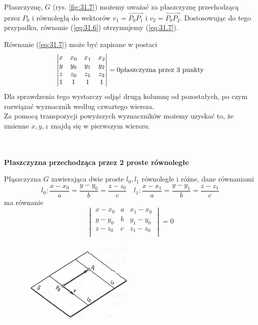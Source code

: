 \begin{dowod}
Płaszczyznę, $G$ (rys. \ref{fig:31.7}) możemy uważać za płaszczyznę przechodzącą przez $P_0$ i równoległą do wektorów $v_1 = \stackrel{\rightarrow}{P_0P_1}$ i $v_2 = \stackrel{\rightarrow}{P_0P_2}$. Dostosowując do tego przypadku, równanie (\ref{eq:31.6}) otrzymujemy (\ref{eq:31.7}).
\end{dowod}

\begin{uwaga}{1}
Równanie (\ref{eq:31.7}) może być zapisane w postaci
\begin{equation}
	\begin{vmatrix}
		x & x_0 & x_1 & x_2\\
		y & y_0 & y_1 & y_2\\
		z & z_0 & z_1 & z_2\\
		1 & 1 & 1 & 1
	\end{vmatrix}
	= 0 \hfill	\textrm{płaszczyzna przez 3 punkty}
	\label{eq:31.7}
\end{equation}
Dla sprawdzenia tego wystarczy odjąć drugą kolumnę od pozostałych, po czym rozwiązać wyznacznik według czwartego wiersza.\\
Za pomocą transpozycji powyższych wyznaczników możemy uzyskać to, że zmienne $x, y, z$ znajdą się w pierwszym wierszu.
\end{uwaga}
\\ \\
\textbf{Płaszczyzna przechodząca przez 2 proste równoległe}
\begin{pkt}{31.4}
Płąszczyzna $G$ zawierająca dwie proste $l_0, l_1$ równoległe i różne, dane równaniami
\begin{equation}
	l_0: \frac{x - x_0}{a} = \frac{y - y_0}{b} = \frac{z - z_0}{c} \quad l_1: \frac{x - x_1}{a} = \frac{y - y_1}{b} = \frac{z - z_1}{c}
\end{equation}
ma równanie 
\begin{equation}
	\begin{vmatrix}
		x - x_0 & a & x_1 - x_0\\
		y - y_0 & b & y_1 - y_0\\
		z - z_0 & c & z_1 - z_0\\
	\end{vmatrix}
	= 0 
	\label{eq:31.8}
\end{equation}
\begin{figure}[ht]
	\centering
		\includegraphics{rys/31_4.png}
	\caption{ }
	\label{fig:31.4}
\end{figure}
\end{pkt}

